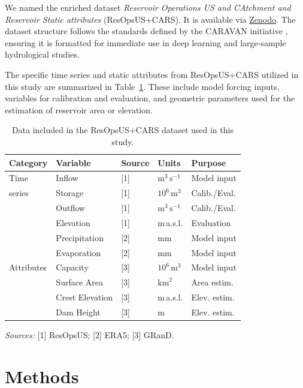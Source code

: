 \documentclass[hess, manuscript]{copernicus}
\begin{document}
We named the enriched dataset \textit{Reservoir Operations US and CAtchment and Reservoir Static attributes} (ResOpsUS+CARS). It is available via \href{https://doi.org/10.5281/zenodo.15978041}{Zenodo}. The dataset structure follows the standards defined by the CARAVAN initiative \citep{Kratzert2023}, ensuring it is formatted for immediate use in deep learning and large-sample hydrological studies.

The specific time series and static attributes from ResOpsUS+CARS utilized in this study are summarized in Table~\ref{tab:data}. These include model forcing inputs, variables for calibration and evaluation, and geometric parameters used for the estimation of reservoir area or elevation.

\begin{table}[t]
    \centering
    \caption{Data included in the ResOpsUS+CARS dataset used in this study.}
    \label{tab:data}
    \begin{tabular*}{\columnwidth}{@{\extracolsep{\fill}}lllll}
        \toprule
        \textbf{Category} & \textbf{Variable} & \textbf{Source} & \textbf{Units} & \textbf{Purpose} \\
        \midrule
        Time & Inflow & [1] & $\text{m}^3\,\text{s}^{-1}$ & Model input \\
        series & Storage & [1] & $10^6\,\text{m}^3$ & Calib./Eval. \\
        & Outflow & [1] & $\text{m}^3\,\text{s}^{-1}$ & Calib./Eval. \\
        & Elevation & [1] & m\,a.s.l. & Evaluation \\
        & Precipitation & [2] & mm & Model input \\
        & Evaporation & [2] & mm & Model input \\
        \midrule
        Attributes & Capacity & [3] & $10^6\,\text{m}^3$ & Model input \\
        & Surface Area & [3] & $\text{km}^2$ & Area estim. \\
        & Crest Elevation & [3] & m\,a.s.l. & Elev. estim. \\
        & Dam Height & [3] & m & Elev. estim. \\
        \bottomrule
    \end{tabular*}
    \small
    \smallskip
    \textit{Sources:} [1] ResOpsUS; [2] ERA5; [3] GRanD.
\end{table}

\section{Methods}
\label{sec:methods}
\end{document}
